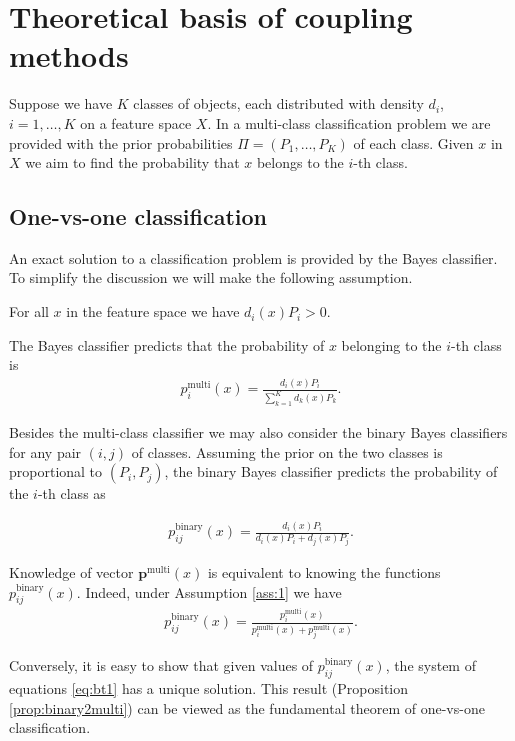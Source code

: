 \section{Theoretical basis of coupling methods} \label{sec:theory}

Suppose we have $K$ classes of objects, each distributed with density $d_i$, $i=1,\ldots, K$ on a feature 
space $X$. In a multi-class classification problem we are provided with 
the prior probabilities $\Pi = (P_1, \ldots, P_K)$ of each class. Given $x$ in $X$ we aim to find 
the probability that $x$ belongs to the $i$-th class. 


\subsection{One-vs-one classification} \label{sec:one-vs-one}

An exact solution to a classification problem is provided by the Bayes classifier. To simplify the discussion we will make the following assumption.

\begin{assumption} \label{ass:1}
For all $x$ in the feature space we have $d_i(x) P_i > 0$.
\end{assumption}


The Bayes classifier predicts that the probability of $x$ belonging to the $i$-th class is
\begin{align}
 p^\textrm{multi}_i(x) = \frac{d_i(x) P_i}{\sum_{k=1}^K d_k(x)P_k}.
\end{align}

Besides the multi-class classifier we may also consider the binary Bayes classifiers for any pair $(i,j)$ of 
classes. Assuming the prior on the two classes is proportional to $(P_i, P_j)$, the binary Bayes classifier 
predicts the probability of the $i$-th class as 

\begin{align}
	p_{ij}^\textrm{binary}(x) = \frac{d_i(x) P_i}{d_i(x)P_i + d_j(x)P_j}.
\end{align}

Knowledge of vector $\boldsymbol{p}^\textrm{multi}(x)$ is equivalent to knowing the functions $p^\textrm{binary}_{ij}(x)$. Indeed, under Assumption \ref{ass:1} we have
\begin{align}
p_{ij}^\textrm{binary}(x) = \frac{p_i^\textrm{multi}(x)}{p_i^\textrm{multi}(x) + p_j^\textrm{multi}(x)}. \label{eq:bt1}
\end{align}

Conversely, it is easy to show that  given values of $p_{ij}^\textrm{binary}(x)$, the system of equations \eqref{eq:bt1} has a unique solution. This result (Proposition \ref{prop:binary2multi}) can be viewed as the fundamental theorem of one-vs-one classification.

